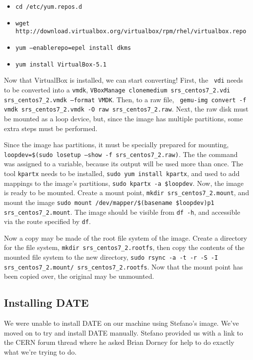 \documentclass[12pt]{article}
\begin{document}
\begin{itemize}
  \item {\tt cd /etc/yum.repos.d}
  \item {\tt wget
      http://download.virtualbox.org/virtualbox/rpm/rhel/virtualbox.repo}
  \item {\tt yum --enablerepo=epel install dkms}
  \item {\tt yum install VirtualBox-5.1}
\end{itemize}

\qq Now that VirtualBox is installed, we can start converting! First, the {\tt
  vdi} needs to be converted into a {\tt vmdk}, {\tt VBoxManage clonemedium
  srs\_centos7\_2.vdi srs\_centos7\_2.vmdk --format VMDK}. Then, to a raw file, {\tt
  gemu-img convert -f vmdk srs\_centos7\_2.vmdk -O raw srs\_centos7\_2.raw}. Next,
the raw disk must be mounted as a loop device, but, since the image has multiple
partitions, some extra steps must be performed. 

\qq Since the image has partitions, it must be specially prepared for mounting,
{\tt loopdev=\$(sudo losetup --show -f srs\_centos7\_2.raw)}. The the command was
assigned to a variable, because its output will be used more than once. The tool
{\tt kpartx} needs to be installed, {\tt sudo yum install kpartx}, and used to
add mappings to the image's partitions, {\tt sudo kpartx -a \$loopdev}. Now, the
image is ready to be mounted. Create a mount point, {\tt mkdir
  srs\_centos7\_2.mount}, and mount the image {\tt sudo mount
  /dev/mapper/\$(basename \$loopdev)p1 srs\_centos7\_2.mount}. The image should be
visible from {\tt df -h}, and accessible via the route specified by {\tt df}.

\qq Now a copy may be made of the root file system of the image. Create a
directory for the file system, {\tt mkdir srs\_centos7\_2.rootfs}, then copy the
contents of the mounted file system to the new directory, {\tt sudo rsync -a -t -r -S
  -I srs\_centos7\_2.mount/ srs\_centos7\_2.rootfs}. Now that the mount point has
been copied over, the original may be unmounted. 

\subsection{Installing DATE}

\qq We were unable to install DATE on our machine using Stefano's image. We've moved on to try and install DATE manually. Stefano provided us with a link to the CERN forum thread where he asked Brian Dorney for help to do exactly what we're trying to do. 
\end{document}

